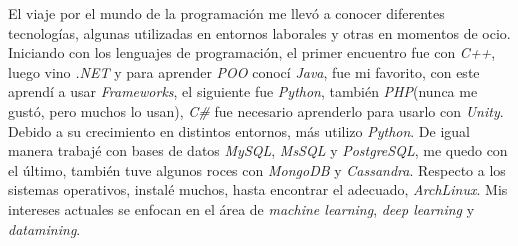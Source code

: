 
\begin{minipage}[t]{0.4\textwidth} %
	\vspace{-\baselineskip} %
	El viaje por el mundo de la programación me llevó a conocer diferentes tecnologías, algunas utilizadas en entornos laborales y otras en momentos de ocio. Iniciando con los lenguajes de programación, el primer encuentro fue con \emph{C++}, luego vino \emph{.NET} y para aprender \emph{POO} conocí \emph{Java}, fue mi favorito, con este aprendí a usar \emph{Frameworks}, el siguiente fue \emph{Python}, también \emph{PHP}(nunca me gustó, pero muchos lo usan), \emph{C\#} fue necesario aprenderlo para usarlo con \emph{Unity}. Debido a su crecimiento en distintos entornos, más utilizo \emph{Python}. De igual manera trabajé con bases de datos \emph{MySQL}, \emph{MsSQL} y \emph{PostgreSQL}, me quedo con el último, también tuve algunos roces con \emph{MongoDB} y \emph{Cassandra}. Respecto a los sistemas operativos, instalé muchos, hasta encontrar el adecuado, \emph{ArchLinux}. Mis intereses actuales se enfocan en el área de \emph{machine learning}, \emph{deep learning} y \emph{datamining}.
\end{minipage}
\hfill %
\begin{minipage}[t]{0.5\textwidth} %
	\vspace{-\baselineskip} %
	\begin{barchart}{5.5}
	\end{barchart}
\end{minipage}

\begin{center}
\end{center}